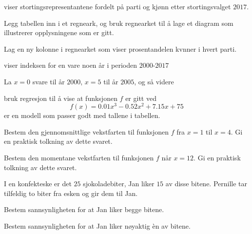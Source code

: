 viser stortingsrepresentantene fordelt på parti og
kjønn etter stortingsvalget $2017$.

\begin{oppgaver}
   Legg tabellen inn i et regneark, og bruk regnearket til å lage et
    diagram som illustrerer opplysningene som er gitt.
\end{oppgaver}

\begin{oppgaver}
   Lag en ny kolonne i regnearket som viser prosentandelen kvnner i
    hvert parti.
\end{oppgaver}


\Oppgave[6] %

viser indeksen for en vare noen år i perioden $2000$-$2017$

La $x=0$ svare til år $2000$, $x=5$ til år $2005$, og så videre

\begin{oppgaver}
   bruk regresjon til å vise at funksjonen $f$ er gitt ved
  \begin{equation*}
    f(x) = \num{0.01} x^3 - \num{0.52}x^2 + \num{7.15}x + 75
  \end{equation*}
  er en modell som passer godt med tallene i tabellen.
\end{oppgaver}

\begin{oppgaver}
   Bestem den gjennomsnittlige vekstfarten til funksjonen $f$ fra
    $x = 1$ til $x = 4$.  Gi en praktisk tolkning av dette svaret.
\end{oppgaver}

\begin{oppgaver}
   Bestem den momentane vekstfarten til funksjonen $f$ når $x = 12$.
    Gi en praktisk tolkning av dette svaret.
\end{oppgaver}


\Oppgave[4] %

I en konfekteske er det $25$ sjokoladebiter, Jan liker $15$ av disse bitene.
Pernille tar tilfeldig to biter fra esken og gir dem til Jan.

\begin{oppgaver}
   Bestem sannsynligheten for at Jan liker begge bitene.
\end{oppgaver}

\begin{oppgaver}
   Bestem sannsynligheten for at Jan liker nøyaktig èn av bitene.
\end{oppgaver}


